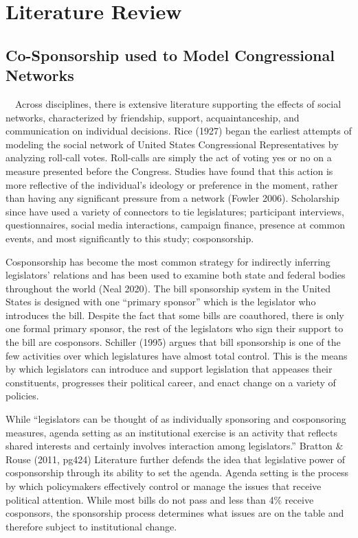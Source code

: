 \documentclass[Royal,times,sageh]{sagej}
\begin{document}
\hypertarget{literature-review}{%
\section{Literature Review}\label{literature-review}}

\hypertarget{co-sponsorship-used-to-model-congressional-networks}{%
\subsection{Co-Sponsorship used to Model Congressional
Networks}\label{co-sponsorship-used-to-model-congressional-networks}}

~~Across disciplines, there is extensive literature supporting the
effects of social networks, characterized by friendship, support,
acquaintanceship, and communication on individual decisions. Rice (1927)
began the earliest attempts of modeling the social network of United
States Congressional Representatives by analyzing roll-call votes.
Roll-calls are simply the act of voting yes or no on a measure presented
before the Congress. Studies have found that this action is more
reflective of the individual's ideology or preference in the moment,
rather than having any significant pressure from a network (Fowler
2006). Scholarship since have used a variety of connectors to tie
legislatures; participant interviews, questionnaires, social media
interactions, campaign finance, presence at common events, and most
significantly to this study; cosponsorship.

Cosponsorship has become the most common strategy for indirectly
inferring legislators' relations and has been used to examine both state
and federal bodies throughout the world (Neal 2020). The bill
sponsorship system in the United States is designed with one ``primary
sponsor'' which is the legislator who introduces the bill. Despite the
fact that some bills are coauthored, there is only one formal primary
sponsor, the rest of the legislators who sign their support to the bill
are cosponsors. Schiller (1995) argues that bill sponsorship is one of
the few activities over which legislatures have almost total control.
This is the means by which legislators can introduce and support
legislation that appeases their constituents, progresses their political
career, and enact change on a variety of policies.

While ``legislators can be thought of as individually sponsoring and
cosponsoring measures, agenda setting as an institutional exercise is an
activity that reflects shared interests and certainly involves
interaction among legislators.'' Bratton \& Rouse (2011, pg424)
Literature further defends the idea that legislative power of
cosponsorship through its ability to set the agenda. Agenda setting is
the process by which policymakers effectively control or manage the
issues that receive political attention. While most bills do not pass
and less than 4\% receive cosponsors, the sponsorship process determines
what issues are on the table and therefore subject to institutional
change.
\end{document}
